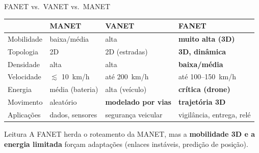 \documentclass[aspectratio=169,11pt]{beamer}
\begin{document}
\begin{frame}{FANET vs.\ VANET vs.\ MANET}
  \begin{center}
    \begin{tabular}{@{}p{2.5cm}p{3.0cm}p{3.0cm}p{3.0cm}@{}}
      \toprule
      & MANET & VANET & FANET\\
      \midrule
      Mobilidade & baixa/média & alta & \textbf{muito alta (3D)} \\
      Topologia & 2D & 2D (estradas) & \textbf{3D, dinâmica} \\
      Densidade & alta & alta & \textbf{baixa/média} \\
      Velocidade & $\lesssim$ 10~km/h & até 200~km/h & até 100--150~km/h \\
      Energia & média (bateria) & alta (veículo) & \textbf{crítica (drone)} \\
      Movimento & aleatório & \textbf{modelado por vias} & \textbf{trajetória 3D} \\
      Aplicações & dados, sensores & segurança veicular & vigilância, entrega, relé \\
      \bottomrule
    \end{tabular}
  \end{center}
  \begin{exampleblock}{Leitura}
    A FANET herda o roteamento da MANET, mas a \textbf{mobilidade 3D e a energia limitada} forçam adaptações (enlaces instáveis, predição de posição).
  \end{exampleblock}
\end{frame}
\end{document}
